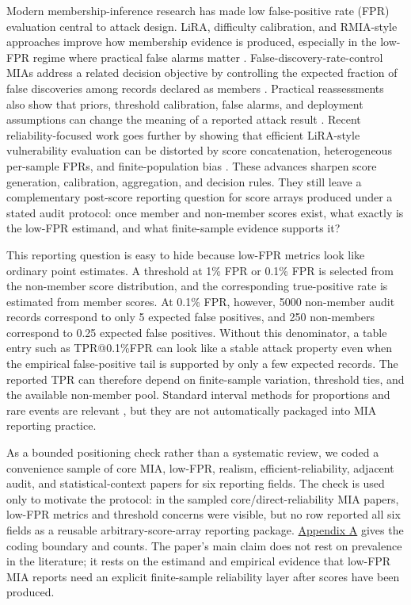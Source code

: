 \documentclass[
  10pt,
  twocolumn]{article}
\begin{document}
Modern membership-inference research has made low false-positive rate (FPR) evaluation central to attack design. LiRA, difficulty calibration, and RMIA-style approaches improve how membership evidence is produced, especially in the low-FPR regime where practical false alarms matter \cite{ref-3,ref-4,ref-5}. False-discovery-rate-control MIAs address a related decision objective by controlling the expected fraction of false discoveries among records declared as members \cite{ref-19}. Practical reassessments also show that priors, threshold calibration, false alarms, and deployment assumptions can change the meaning of a reported attack result \cite{ref-6,ref-7,ref-8}. Recent reliability-focused work goes further by showing that efficient LiRA-style vulnerability evaluation can be distorted by score concatenation, heterogeneous per-sample FPRs, and finite-population bias \cite{ref-12}. These advances sharpen score generation, calibration, aggregation, and decision rules. They still leave a complementary post-score reporting question for score arrays produced under a stated audit protocol: once member and non-member scores exist, what exactly is the low-FPR estimand, and what finite-sample evidence supports it?

This reporting question is easy to hide because low-FPR metrics look like ordinary point estimates. A threshold at 1\% FPR or 0.1\% FPR is selected from the non-member score distribution, and the corresponding true-positive rate is estimated from member scores. At 0.1\% FPR, however, 5000 non-member audit records correspond to only 5 expected false positives, and 250 non-members correspond to 0.25 expected false positives. Without this denominator, a table entry such as TPR@0.1\%FPR can look like a stable attack property even when the empirical false-positive tail is supported by only a few expected records. The reported TPR can therefore depend on finite-sample variation, threshold ties, and the available non-member pool. Standard interval methods for proportions and rare events are relevant \cite{ref-9,ref-10}, but they are not automatically packaged into MIA reporting practice.

As a bounded positioning check rather than a systematic review, we coded a convenience sample of core MIA, low-FPR, realism, efficient-reliability, adjacent audit, and statistical-context papers for six reporting fields. The check is used only to motivate the protocol: in the sampled core/direct-reliability MIA papers, low-FPR metrics and threshold concerns were visible, but no row reported all six fields as a reusable arbitrary-score-array reporting package. \protect\hyperlink{appendix-a-reporting-practice-mini-audit}{Appendix A} gives the coding boundary and counts. The paper's main claim does not rest on prevalence in the literature; it rests on the estimand and empirical evidence that low-FPR MIA reports need an explicit finite-sample reliability layer after scores have been produced.
\end{document}
